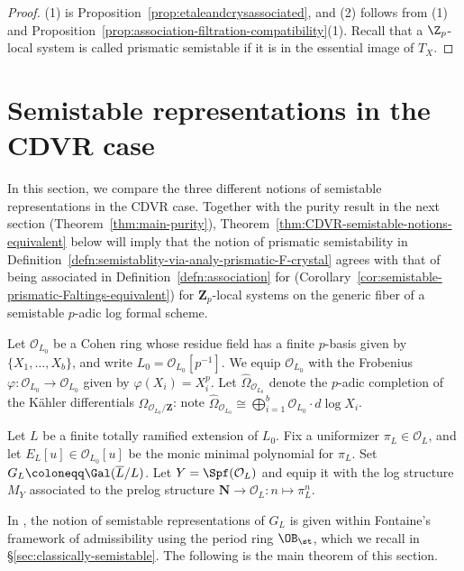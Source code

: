 \begin{proof}
(1) is Proposition~\ref{prop:etaleandcrysassociated}, and (2) follows from (1) and Proposition~\ref{prop:association-filtration-compatibility}(1).
Recall that a $\Z_p$-local system is called prismatic semistable if it is in the essential image of $T_X$.
\end{proof}


\section{Semistable representations in the CDVR case} \label{sec:CDVR-semistable-representations}

In this section, we compare the three different notions of semistable representations in the CDVR case. Together with the purity result in the next section (Theorem~\ref{thm:main-purity}), Theorem~\ref{thm:CDVR-semistable-notions-equivalent}  below will imply that the notion of prismatic semistability in Definition~\ref{defn:semistablity-via-analy-prismatic-F-crystal} agrees with that of being associated in Definition~\ref{defn:association} for  (Corollary~\ref{cor:semistable-prismatic-Faltings-equivalent}) for $\mathbf{Z}_p$-local systems on the generic fiber of a semistable $p$-adic log formal scheme.

Let $\mathcal{O}_{L_0}$ be a Cohen ring whose residue field has a finite $p$-basis given by $\{X_1, \ldots, X_b\}$, and write $L_0 = \mathcal{O}_{L_0}[p^{-1}]$. We equip $\mathcal{O}_{L_0}$ with the Frobenius $\varphi\colon \mathcal{O}_{L_0} \rightarrow \mathcal{O}_{L_0}$ given by $\varphi(X_i) =X_i^p$. Let $\widehat{\Omega}_{\mathcal{O}_{L_0}}$ denote the $p$-adic completion of the K\"{a}hler differentials $\Omega_{\mathcal{O}_{L_0}/\mathbf{Z}}$: note 
$\widehat{\Omega}_{\mathcal{O}_{L_0}} \cong \bigoplus_{i=1}^b \mathcal{O}_{L_0}\cdot d\operatorname{log} X_i$.

Let $L$ be a finite totally ramified extension of $L_0$. Fix a uniformizer $\pi_L \in \mathcal{O}_L$, and let $E_L[u] \in \mathcal{O}_{L_0}[u]$ be the monic minimal polynomial for $\pi_L$. Set $G_L \coloneqq \Gal (\overline L / L)$. Let $Y=\Spf(\mathcal{O}_L)$ and equip it with the log structure $M_Y$ associated to the prelog structure $\mathbf{N} \rightarrow \mathcal{O}_L: n \mapsto \pi_L^n$.

In \cite{Morita-imperfsemistable}, the notion of semistable representations of $G_L$ is given within Fontaine's framework of admissibility using the period ring $\OB_{\st}$, which we recall in \S\ref{sec:classically-semistable}. The following is the main theorem of this section.

